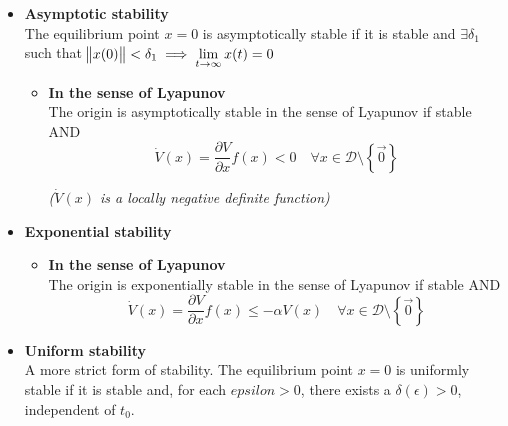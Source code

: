 {\begin{itemize}
    
    \item \textbf{Asymptotic stability}\\
    The equilibrium point $x=0$ is asymptotically stable if it is stable and $\exists \delta_1$ such that $\norm{x(0)}<\delta_1 \implies \lim\limits_{t\rightarrow\infty}x(t)=0$

    \begin{itemize}
        \item \textbf{In the sense of Lyapunov}\\
        The origin is asymptotically stable in the sense of Lyapunov if stable AND
        \[\dot{V}(x)=\frac{\partial V}{\partial x} f(x) < 0 \quad \forall x \in \mathcal{D}\setminus\left\{\Vec{0}\right\}\]
        \begin{center}
            \textit{($\dot{V}(x)$ is a locally negative definite function)}
        \end{center}
    \end{itemize}
    
    \item \textbf{Exponential stability}\\  
    \begin{itemize}
        \item \textbf{In the sense of Lyapunov}\\
        The origin is exponentially stable in the sense of Lyapunov if stable AND
        \[\dot{V}(x)=\frac{\partial V}{\partial x} f(x) \leq -\alpha V(x) \quad \forall x \in \mathcal{D}\setminus\left\{\Vec{0}\right\}\]
    \end{itemize}
    
    \item \textbf{Uniform stability}\\
    A more strict form of stability. The equilibrium point $x=0$ is uniformly stable if it is stable and, for each $epsilon>0$, there exists a $\delta(\epsilon)>0$, independent of $t_0$.
\end{itemize}
}





